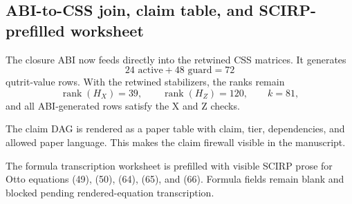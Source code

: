 \subsection{ABI-to-CSS join, claim table, and SCIRP-prefilled worksheet}
\label{sec:bt1471-bt1473-abi-css-claim-prefill}

The closure ABI now feeds directly into the retwined CSS matrices.  It generates
\[
24\text{ active}+48\text{ guard}=72
\]
qutrit-value rows.  With the retwined stabilizers, the ranks remain
\[
\operatorname{rank}(H_X)=39,
\qquad
\operatorname{rank}(H_Z)=120,
\qquad
k=81,
\]
and all ABI-generated rows satisfy the X and Z checks.

The claim DAG is rendered as a paper table with claim, tier, dependencies, and
allowed paper language.  This makes the claim firewall visible in the manuscript.

The formula transcription worksheet is prefilled with visible SCIRP prose for
Otto equations (49), (50), (64), (65), and (66).  Formula fields remain blank and
blocked pending rendered-equation transcription.
